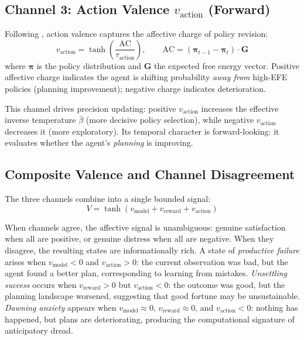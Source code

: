 \documentclass[11pt,a4paper]{article}
\begin{document}
\subsection{Channel 3: Action Valence $v_{\text{action}}$ (Forward)}\label{sec:v_action}

Following \citet{hesp2021deeply}, action valence captures the affective charge of policy revision:
\begin{equation}
    v_{\text{action}} = \tanh\!\left(\frac{\text{AC}}{\tau_{\text{action}}}\right), \qquad \text{AC} = (\boldsymbol{\pi}_{t-1} - \boldsymbol{\pi}_t) \cdot \mathbf{G}
\end{equation}
where $\boldsymbol{\pi}$ is the policy distribution and $\mathbf{G}$ the expected free energy vector. Positive affective charge indicates the agent is shifting probability \emph{away from} high-EFE policies (planning improvement); negative charge indicates deterioration.

This channel drives precision updating: positive $v_{\text{action}}$ increases the effective inverse temperature $\bar{\beta}$ (more decisive policy selection), while negative $v_{\text{action}}$ decreases it (more exploratory). Its temporal character is forward-looking: it evaluates whether the agent's \emph{planning} is improving.

\subsection{Composite Valence and Channel Disagreement}\label{sec:composite}

The three channels combine into a single bounded signal:
\begin{equation}
    V = \tanh(v_{\text{model}} + v_{\text{reward}} + v_{\text{action}})
\end{equation}

When channels agree, the affective signal is unambiguous: genuine satisfaction when all are positive, or genuine distress when all are negative. When they disagree, the resulting states are informationally rich. A state of \emph{productive failure} arises when $v_{\text{model}} < 0$ and $v_{\text{action}} > 0$: the current observation was bad, but the agent found a better plan, corresponding to learning from mistakes. \emph{Unsettling success} occurs when $v_{\text{reward}} > 0$ but $v_{\text{action}} < 0$: the outcome was good, but the planning landscape worsened, suggesting that good fortune may be unsustainable. \emph{Dawning anxiety} appears when $v_{\text{model}} \approx 0$, $v_{\text{reward}} \approx 0$, and $v_{\text{action}} < 0$: nothing has happened, but plans are deteriorating, producing the computational signature of anticipatory dread.
\end{document}
